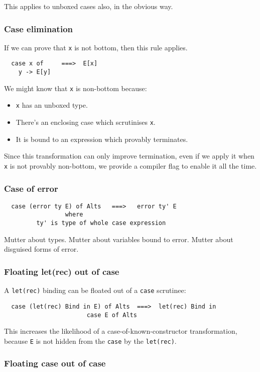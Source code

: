 \documentclass[11pt]{article}
\begin{document}
This applies to unboxed cases also, in the obvious way.

\subsubsection{Case elimination}

If we can prove that \texttt{x} is not bottom, then this rule applies.
\begin{lstlisting}
  case x of	    ===>  E[x]
	y -> E[y]
\end{lstlisting}
We might know that \texttt{x} is non-bottom because:
\begin{itemize}
\item \texttt{x} has an unboxed type.
\item There's an enclosing case which scrutinises \texttt{x}.
\item It is bound to an expression which provably terminates.
\end{itemize}
Since this transformation can only improve termination, even if we apply it
when \texttt{x} is not provably non-bottom, we provide a compiler flag to 
enable it all the time.

\subsubsection{Case of error}

\begin{lstlisting}
  case (error ty E) of Alts   ===>   error ty' E
			     where
	     ty' is type of whole case expression
\end{lstlisting}

Mutter about types.  Mutter about variables bound to error.
Mutter about disguised forms of error.

\subsubsection{Floating let(rec) out of case}

A \texttt{let(rec)} binding can be floated out of a \texttt{case} scrutinee:
\begin{lstlisting}
  case (let(rec) Bind in E) of Alts  ===>  let(rec) Bind in 
   					   case E of Alts
\end{lstlisting}
This increases the likelihood of a case-of-known-constructor transformation,
because \texttt{E} is not hidden from the \texttt{case} by the \texttt{let(rec)}.

\subsubsection{Floating case out of case}
\end{document}
